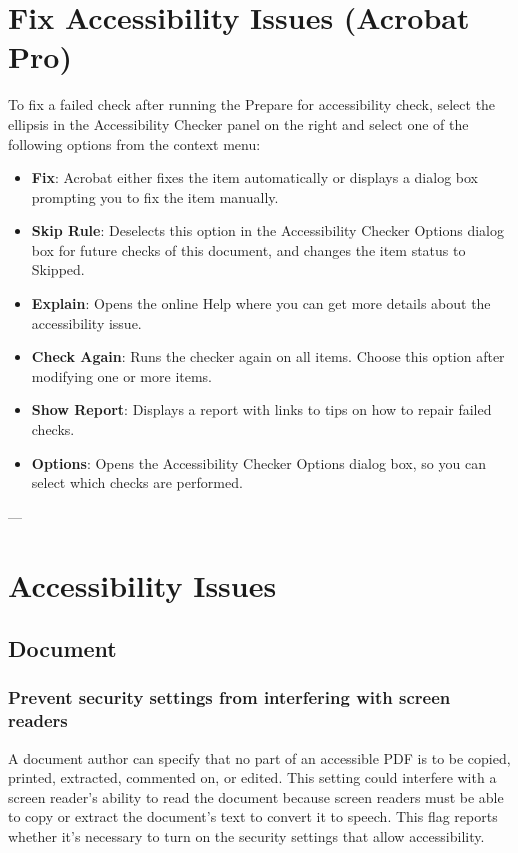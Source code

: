 \section*{Fix Accessibility Issues (Acrobat Pro)}
To fix a failed check after running the Prepare for accessibility check, select the ellipsis in the Accessibility Checker panel on the right and select one of the following options from the context menu\footnotemark[1]:
\begin{itemize}
    \item \textbf{Fix}: Acrobat either fixes the item automatically or displays a dialog box prompting you to fix the item manually.
    \item \textbf{Skip Rule}: Deselects this option in the Accessibility Checker Options dialog box for future checks of this document, and changes the item status to Skipped.
    \item \textbf{Explain}: Opens the online Help where you can get more details about the accessibility issue.
    \item \textbf{Check Again}: Runs the checker again on all items. Choose this option after modifying one or more items.
    \item \textbf{Show Report}: Displays a report with links to tips on how to repair failed checks.
    \item \textbf{Options}: Opens the Accessibility Checker Options dialog box, so you can select which checks are performed.
\end{itemize}

---

\section*{Accessibility Issues}

\subsection*{Document}
\subsubsection*{Prevent security settings from interfering with screen readers}
A document author can specify that no part of an accessible PDF is to be copied, printed, extracted, commented on, or edited. This setting could interfere with a screen reader's ability to read the document because screen readers must be able to copy or extract the document's text to convert it to speech. This flag reports whether it's necessary to turn on the security settings that allow accessibility\footnotemark[1].


